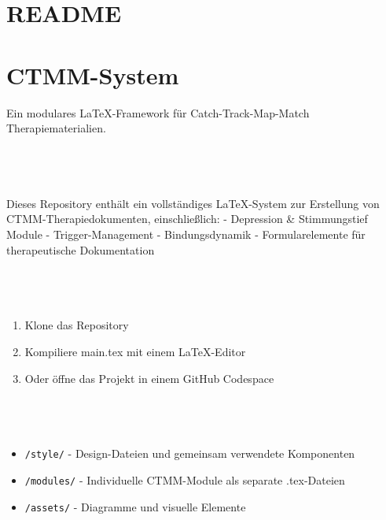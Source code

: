 
\section{README}
\label{sec:readme}

\hypertarget{ctmm-system}{%
\section{CTMM-System}\label{ctmm-system}}

Ein modulares LaTeX-Framework für Catch-Track-Map-Match Therapiematerialien.

\hypertarget{uxfcberblick}{%
\subsection{\textcolor{ctmmBlue}{\faBook~\1}}\label{uxfcberblick}}

Dieses Repository enthält ein vollständiges LaTeX-System zur Erstellung von CTMM-Therapiedokumenten, einschließlich: - Depression \& Stimmungstief Module - Trigger-Management - Bindungsdynamik - Formularelemente für therapeutische Dokumentation

\hypertarget{verwendung}{%
\subsection{\textcolor{ctmmBlue}{\faBook~\1}}\label{verwendung}}

\begin{enumerate}
\def\labelenumi{\arabic{enumi}.}
\tightlist
\item
  Klone das Repository
\item
  Kompiliere main.tex mit einem LaTeX-Editor
\item
  Oder öffne das Projekt in einem GitHub Codespace
\end{enumerate}

\hypertarget{struktur}{%
\subsection{\textcolor{ctmmBlue}{\faBook~\1}}\label{struktur}}

\begin{itemize}[label=\textcolor{ctmmOrange}{\faArrowRight}]
\tightlist
\item
  \texttt{/style/} - Design-Dateien und gemeinsam verwendete Komponenten
\item
  \texttt{/modules/} - Individuelle CTMM-Module als separate .tex-Dateien
\item
  \texttt{/assets/} - Diagramme und visuelle Elemente
\end{itemize}

